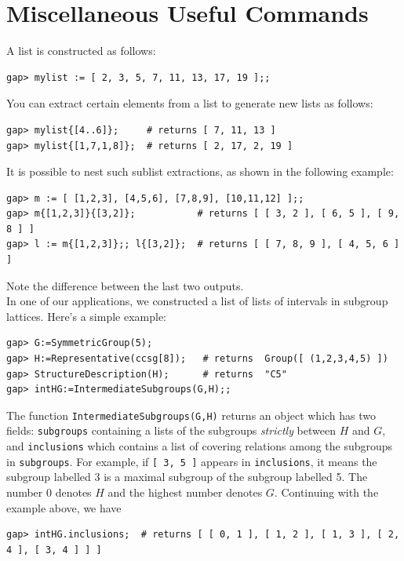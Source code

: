 \documentclass[11pt]{amsart}
\theoremstyle{plain}
\newcommand{\codesize}{\footnotesize}
\newcommand{\<}{\ensuremath{\langle}}
\renewcommand{\>}{\ensuremath{\rangle}}
\begin{document}
\section{Miscellaneous Useful Commands}
\label{sec:lists}
A list is constructed as follows:
{\codesize
\begin{verbatim}
gap> mylist := [ 2, 3, 5, 7, 11, 13, 17, 19 ];;
\end{verbatim}}
\noindent You can extract certain elements from a list to generate new lists as follows:
{\codesize
\begin{verbatim}
gap> mylist{[4..6]};     # returns [ 7, 11, 13 ]
gap> mylist{[1,7,1,8]};  # returns [ 2, 17, 2, 19 ]
\end{verbatim}}
\noindent It is possible to nest such sublist extractions, as shown in the following example:
{\codesize
\begin{verbatim}
gap> m := [ [1,2,3], [4,5,6], [7,8,9], [10,11,12] ];; 
gap> m{[1,2,3]}{[3,2]};           # returns [ [ 3, 2 ], [ 6, 5 ], [ 9, 8 ] ]
gap> l := m{[1,2,3]};; l{[3,2]};  # returns [ [ 7, 8, 9 ], [ 4, 5, 6 ] ]
\end{verbatim}}
\noindent Note the difference between the last two outputs.
\\[4pt]
In one of our applications, we constructed a list of lists of intervals
in subgroup lattices.  Here's a simple example:
{\codesize
\begin{verbatim}
gap> G:=SymmetricGroup(5);
gap> H:=Representative(ccsg[8]);   # returns  Group([ (1,2,3,4,5) ])
gap> StructureDescription(H);      # returns  "C5"
gap> intHG:=IntermediateSubgroups(G,H);;
\end{verbatim}}
\noindent The function {\tt IntermediateSubgroups(G,H)} returns an object which has two fields:
{\tt subgroups} containing a lists of the subgroups \emph{strictly} between $H$ and
$G$, and {\tt inclusions} which contains a list of covering relations among the
subgroups in {\tt subgroups}.    For example, if {\tt [ 3, 5 ]} appears in
{\tt inclusions}, it means the subgroup labelled 3 is a maximal subgroup of the
subgroup labelled 5. 
The number 0 denotes $H$ and the highest number denotes $G$.  Continuing with
the example above, we have
{\codesize
\begin{verbatim}
gap> intHG.inclusions;  # returns [ [ 0, 1 ], [ 1, 2 ], [ 1, 3 ], [ 2, 4 ], [ 3, 4 ] ] ]
\end{verbatim}}
\end{document}
